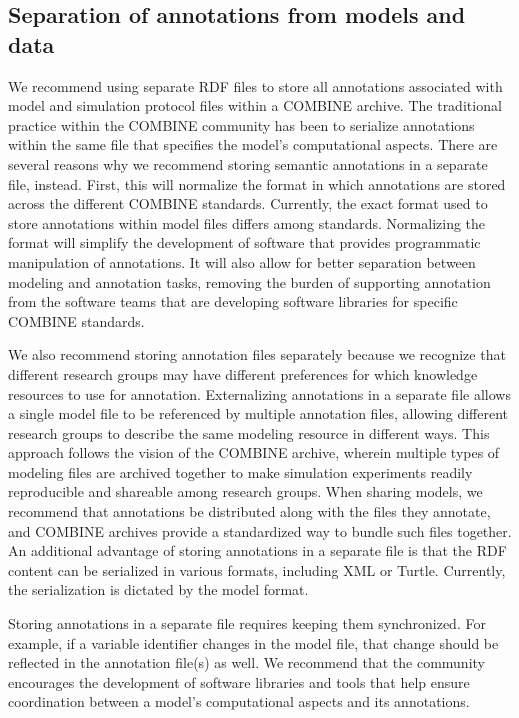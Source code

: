 \documentclass[pdftex,rgb,dvipsnames,svgnames,hyperref,table]{report}
\begin{document}
\subsection{Separation of annotations from models and data}
We recommend using separate RDF files to store all annotations associated with model and simulation protocol files within a COMBINE archive. The traditional practice within the COMBINE community has been to serialize annotations within the same file that specifies the model’s computational aspects. There are several reasons why we recommend storing semantic annotations in a separate file, instead. First, this will normalize the format in which annotations are stored across the different COMBINE standards. Currently, the exact format used to store annotations within model files differs among standards. Normalizing the format will simplify the development of software that provides programmatic manipulation of annotations. It will also allow for better separation between modeling and annotation tasks, removing the burden of supporting annotation from the software teams that are developing software libraries for specific COMBINE standards.

We also recommend storing annotation files separately because we recognize that different research groups may have different preferences for which knowledge resources to use for annotation. Externalizing annotations in a separate file allows a single model file to be referenced by multiple annotation files, allowing different research groups to describe the same modeling resource in different ways. This approach follows the vision of the COMBINE archive, wherein multiple types of modeling files are archived together to make simulation experiments readily reproducible and shareable among research groups. When sharing models, we recommend that annotations be distributed along with the files they annotate, and COMBINE archives provide a standardized way to bundle such files together. An additional advantage of storing annotations in a separate file is that the RDF content can be serialized in various formats, including XML or Turtle. Currently, the serialization is dictated by the model format.

Storing annotations in a separate file requires keeping them synchronized. For example, if a variable identifier changes in the model file, that change should be reflected in the annotation file(s) as well. We recommend that the community encourages the development of software libraries and tools that help ensure coordination between a model’s computational aspects and its annotations.
\end{document}
